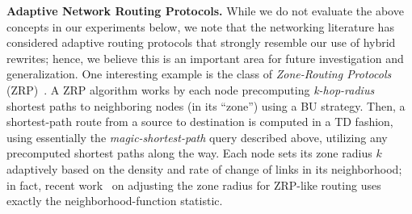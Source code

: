\vspace*{.3em}\noindent
{\bf Adaptive Network Routing Protocols.\/}
While we do not evaluate the above concepts in our experiments below,
we note that the networking literature has considered adaptive routing protocols
that strongly resemble our use of hybrid rewrites; hence, we believe
this is an important area for future investigation and generalization.
One interesting example is the class of
{\em Zone-Routing Protocols} (ZRP)~\cite{zrp}.
A ZRP algorithm works by each node precomputing {\em k-hop-radius\/} shortest paths to
neighboring nodes (in its ``zone'')  using a BU strategy.
Then, a shortest-path route from a source to destination is computed in a
TD fashion, using essentially the {\em magic-shortest-path} query described above, 
utilizing any precomputed shortest paths along the way.
Each node sets its zone radius $k$ adaptively based on the density and rate of change of 
links in its neighborhood; in fact,
recent work~\cite{sharp} on adjusting the zone radius for ZRP-like routing uses
exactly the neighborhood-function statistic.












